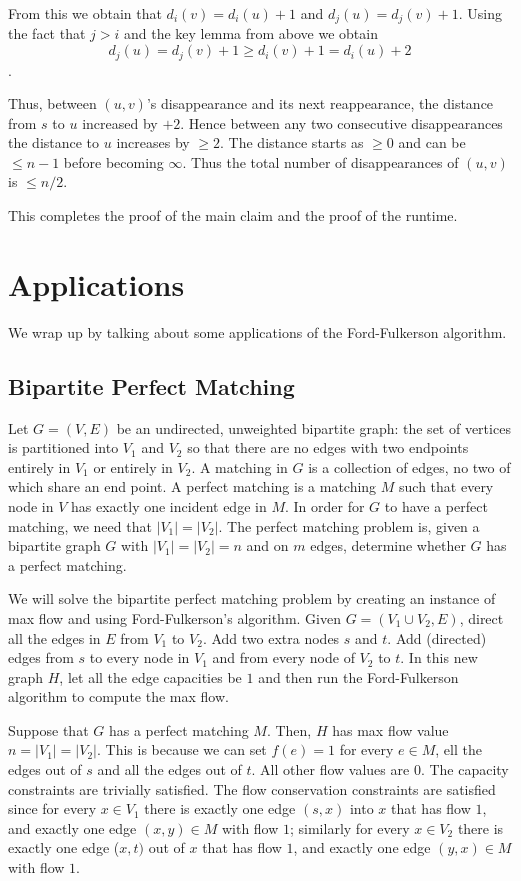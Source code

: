 \documentclass [12pt]{article}
\theoremstyle{definition}
\begin{document}
From this we obtain that $d_i (v ) = d_i (u) + 1$ and $d_j (u) = d_j (v ) + 1$. Using the fact that $j > i$ and the key lemma from above we obtain 
$$
d_j (u) = d_j (v ) + 1 \geq d_i (v ) + 1 = d_i (u) + 2
$$. 

Thus, between $(u, v )$'s disappearance and its next reappearance, the distance from $s$ to $u$ increased by $+2$. Hence between any two consecutive disappearances the distance to $u$ increases by $\geq 2$. The distance starts as $\geq 0$ and can be $\leq n - 1$ before becoming $\infty$. Thus the total number of disappearances of $(u, v ) $is $\leq n/2.$ 

This completes the proof of the main claim and the proof of the runtime. 

\section{Applications}
We wrap up by talking about some applications of the Ford-Fulkerson algorithm.

\subsection{Bipartite Perfect Matching} 

Let $G = (V, E)$ be an undirected, unweighted bipartite graph: the set of vertices is partitioned into $V_1$ and $V_2$ so that there are no edges with two endpoints entirely in $V_1$ or entirely in $V_2$. A matching in $G$ is a collection of edges, no two of which share an end point. A perfect matching is a matching $M$ such that every node in $V$ has exactly one incident edge in $M$. In order for $G$ to have a perfect matching, we need that $|V_1| = |V_2|$. The perfect matching problem is, given a bipartite graph $G$ with $|V_1| = |V_2| = n$ and on $m$ edges, determine whether $G$ has a perfect matching. 

We will solve the bipartite perfect matching problem by creating an instance of max flow and using Ford-Fulkerson’s algorithm. Given $G = (V_1 \cup V_2, E)$, direct all the edges in $E$ from $V_1$ to $V_2$. Add two extra nodes $s$ and $t$. Add (directed) edges from $s$ to every node in $V_1$ and from every node of $V_2$ to $t$. In this new graph $H$, let all the edge capacities be $1$ and then run the Ford-Fulkerson algorithm to compute the max flow. 

Suppose that $G$ has a perfect matching $M$. Then, $H$ has max flow value $n = |V_1| = |V_2|$. This is because we can set $f (e) = 1$ for every $e \in M$, ell the edges out of $s$ and all the edges out of $t$. All other flow values are $0$. The capacity constraints are trivially satisfied. The flow conservation constraints are satisfied since for every $x \in V_1$ there is exactly one edge $(s, x)$ into $x$ that has flow $1$, and exactly one edge $(x, y ) \in M$ with flow $1$; similarly for every $x \in V_2$ there is exactly one edge ($x, t)$ out of $x$ that has flow $1$, and exactly one edge $(y, x) \in M$ with flow $1$. 
\end{document}
